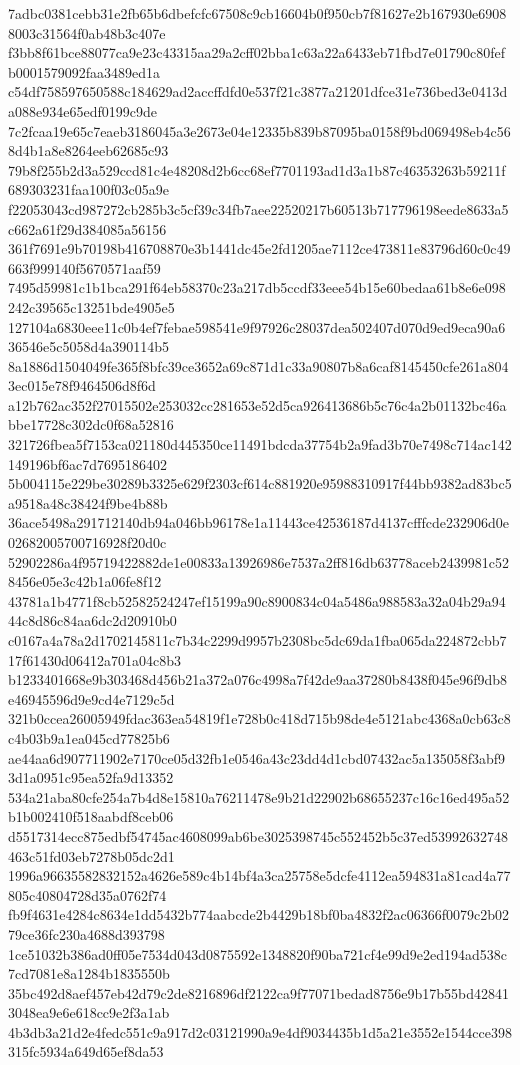 {7adbc0381cebb31e2fb65b6dbefcfc67508c9cb16604b0f950cb7f81627e2b167930e69088003c31564f0ab48b3c407e
f3bb8f61bce88077ca9e23c43315aa29a2cff02bba1c63a22a6433eb71fbd7e01790c80fefb0001579092faa3489ed1a
c54df758597650588c184629ad2accffdfd0e537f21c3877a21201dfce31e736bed3e0413da088e934e65edf0199c9de
7c2fcaa19e65c7eaeb3186045a3e2673e04e12335b839b87095ba0158f9bd069498eb4c568d4b1a8e8264eeb62685c93
79b8f255b2d3a529ccd81c4e48208d2b6cc68ef7701193ad1d3a1b87c46353263b59211f689303231faa100f03c05a9e
f22053043cd987272cb285b3c5cf39c34fb7aee22520217b60513b717796198eede8633a5c662a61f29d384085a56156
361f7691e9b70198b416708870e3b1441dc45e2fd1205ae7112ce473811e83796d60c0c49663f999140f5670571aaf59
7495d59981c1b1bca291f64eb58370c23a217db5ccdf33eee54b15e60bedaa61b8e6e098242c39565c13251bde4905e5
127104a6830eee11c0b4ef7febae598541e9f97926c28037dea502407d070d9ed9eca90a636546e5c5058d4a390114b5
8a1886d1504049fe365f8bfc39ce3652a69c871d1c33a90807b8a6caf8145450cfe261a8043ec015e78f9464506d8f6d
a12b762ac352f27015502e253032cc281653e52d5ca926413686b5c76c4a2b01132bc46abbe17728c302dc0f68a52816
321726fbea5f7153ca021180d445350ce11491bdcda37754b2a9fad3b70e7498c714ac142149196bf6ac7d7695186402
5b004115e229be30289b3325e629f2303cf614c881920e95988310917f44bb9382ad83bc5a9518a48c38424f9be4b88b
36ace5498a291712140db94a046bb96178e1a11443ce42536187d4137cfffcde232906d0e02682005700716928f20d0c
52902286a4f95719422882de1e00833a13926986e7537a2ff816db63778aceb2439981c528456e05e3c42b1a06fe8f12
43781a1b4771f8cb52582524247ef15199a90c8900834c04a5486a988583a32a04b29a9444c8d86c84aa6dc2d20910b0
c0167a4a78a2d1702145811c7b34c2299d9957b2308bc5dc69da1fba065da224872cbb717f61430d06412a701a04c8b3
b1233401668e9b303468d456b21a372a076c4998a7f42de9aa37280b8438f045e96f9db8e46945596d9e9cd4e7129c5d
321b0ccea26005949fdac363ea54819f1e728b0c418d715b98de4e5121abc4368a0cb63c8c4b03b9a1ea045cd77825b6
ae44aa6d907711902e7170ce05d32fb1e0546a43c23dd4d1cbd07432ac5a135058f3abf93d1a0951c95ea52fa9d13352
534a21aba80cfe254a7b4d8e15810a76211478e9b21d22902b68655237c16c16ed495a52b1b002410f518aabdf8ceb06
d5517314ecc875edbf54745ac4608099ab6be3025398745c552452b5c37ed53992632748463c51fd03eb7278b05dc2d1
1996a96635582832152a4626e589c4b14bf4a3ca25758e5dcfe4112ea594831a81cad4a77805c40804728d35a0762f74
fb9f4631e4284c8634e1dd5432b774aabcde2b4429b18bf0ba4832f2ac06366f0079c2b0279ce36fc230a4688d393798
1ce51032b386ad0ff05e7534d043d0875592e1348820f90ba721cf4e99d9e2ed194ad538c7cd7081e8a1284b1835550b
35bc492d8aef457eb42d79c2de8216896df2122ca9f77071bedad8756e9b17b55bd428413048ea9e6e618cc9e2f3a1ab
4b3db3a21d2e4fedc551c9a917d2c03121990a9e4df9034435b1d5a21e3552e1544cce398315fc5934a649d65ef8da53
}
